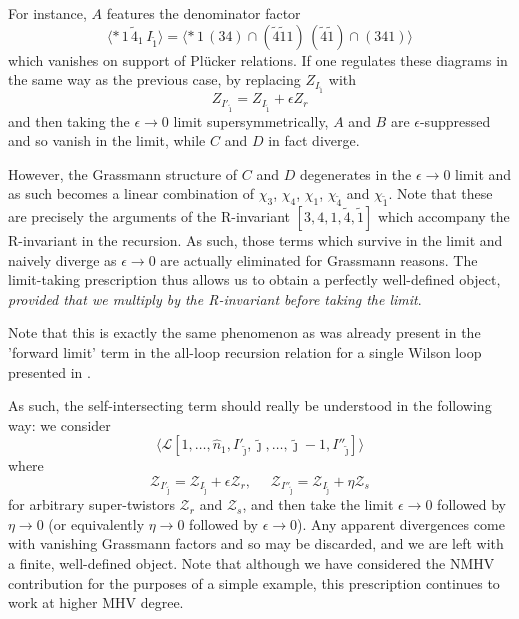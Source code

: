 \documentclass[12pt]{article}
\numberwithin{equation}{section}
\begin{document}
\begin{enumerate}
For instance, \(A\) features the denominator factor
\begin{equation}
\langle * \, 1 \,\tilde{4}_1 \,I_{\tilde{1}} \rangle = \langle *\, 1\, (34)\cap(\tilde{4}\tilde{1}1) \,(\tilde{4} \tilde{1}) \cap (341) \rangle 
\end{equation}
which vanishes on support of Plücker relations. If one regulates these diagrams in the same way as the previous case, by replacing \(Z_{I_{\tilde{1}}}\) with 
\begin{equation}
Z_{I'_{\tilde{1}}} = Z_{I_{\tilde{1}}} + \epsilon Z_r
\end{equation}
and then taking the \(\epsilon \to 0\) limit supersymmetrically, \(A\) and \(B\) are \(\epsilon\)-suppressed and so vanish in the limit, while \(C\) and \(D\) in fact diverge.

However, the Grassmann structure of \(C\) and \(D\) degenerates in the \(\epsilon \to 0\) limit and as such becomes a linear combination of \(\chi_3\), \(\chi_4\), \(\chi_1\), \(\chi_{\tilde{4}}\) and \(\chi_{\tilde{1}}\). Note that these are precisely the arguments of the R-invariant \([3,4,1,\tilde{4},\tilde{1}]\) which accompany the R-invariant in the recursion. As such, those terms which survive in the limit and naively diverge as \(\epsilon \to 0\) are actually eliminated for Grassmann reasons. The limit-taking prescription thus allows us to obtain a perfectly well-defined object, \emph{provided that we multiply by the R-invariant before taking the limit}.

Note that this is exactly the same phenomenon as was already present in the 'forward limit' term in the all-loop recursion relation for a single Wilson loop presented in \cite{Arkani-Hamed:2010zjl}.

\end{enumerate}

As such, the self-intersecting term should really be understood in the following way: we consider
\begin{equation}
[n-1,n,1,\tilde{\jmath}-1,\tilde{\jmath}]\langle \mathcal{L}[1,\ldots,\hat{n}_1,I'_{\tilde{\jmath}},\tilde{\jmath},\ldots,\tilde{\jmath}-1,I''_{\tilde{\jmath}}]\rangle
\end{equation}
where
\begin{equation}
\mathcal{Z}_{I'_{\tilde{\jmath}}} =  \mathcal{Z}_{I_{\tilde{\jmath}}}  + \epsilon \mathcal{Z}_r, \, \, \, \, \, \, \, \, \mathcal{Z}_{I''_{\tilde{\jmath}}} =  \mathcal{Z}_{I_{\tilde{\jmath}}}  + \eta \mathcal{Z}_s
\end{equation}
for arbitrary super-twistors \(\mathcal{Z}_r\) and \(\mathcal{Z}_s\), and then take the limit \(\epsilon \to 0\) followed by \(\eta \to 0\) (or equivalently \(\eta \to 0\) followed by \(\epsilon \to 0\)). Any apparent divergences come with vanishing Grassmann factors and so may be discarded, and we are left with a finite, well-defined object. Note that although we have considered the NMHV contribution for the purposes of a simple example, this prescription continues to work at higher MHV degree. 
\end{document}
